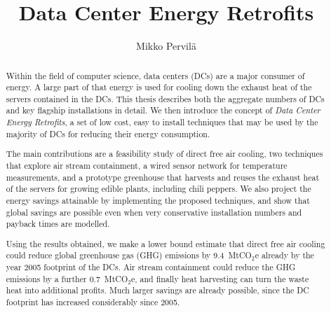 \documentclass[officiallayout]{tktla}
\title{Data Center Energy Retrofits}
\author{Mikko Pervilä}
\begin{document}
\frontmatter
\maketitle

\begin{abstract}

Within the field of computer science, data centers (DCs) are a major consumer
of energy. A large part of that energy is used for cooling down the exhaust
heat of the servers contained in the DCs. This thesis describes both the
aggregate numbers of DCs and key flagship installations in detail. We then
introduce the concept of \emph{Data Center Energy Retrofits}, a set of low
cost, easy to install techniques that may be used by the majority of DCs for
reducing their energy consumption.

The main contributions are a feasibility study of direct free air cooling, two
techniques that explore air stream containment, a wired sensor network for
temperature measurements, and a prototype greenhouse that harvests and reuses
the exhaust heat of the servers for growing edible plants, including chili
peppers. We also project the energy savings attainable by implementing the
proposed techniques, and show that global savings are possible even when very
conservative installation numbers and payback times are modelled.

Using the results obtained, we make a lower bound estimate that direct free
air cooling could reduce global greenhouse gas (GHG) emissions by
9.4~MtCO$_2$e already by the year 2005 footprint of the DCs. Air stream
containment could reduce the GHG emissions by a further 0.7~MtCO$_2$e, and
finally heat harvesting can turn the waste heat into additional profits. Much
larger savings are already possible, since the DC footprint has increased
considerably since 2005.

\end{abstract}


\begin{acknowledgements}

\end{acknowledgements}

\begingroup
\let\cleardoublepage\relax
\clearpage
\tableofcontents
\clearpage
\setcontributionon   %
\listofpublications
\endgroup
\end{document}
